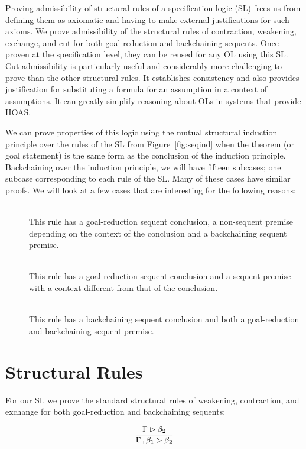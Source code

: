 Proving admissibility of structural rules of a specification logic (SL) frees us from defining them as axiomatic and having to make external justifications for such axioms. We prove admissibility of the structural rules of contraction, weakening, exchange, and cut for both goal-reduction and backchaining sequents. Once proven at the specification level, they can be reused for any OL using this SL. Cut admissibility is particularly useful and considerably more challenging to prove than the other structural rules. It establishes consistency and also provides justification for substituting a formula for an assumption in a context of assumptions. It can greatly simplify reasoning about OLs in systems that provide HOAS.

We can prove properties of this logic using the mutual structural induction principle over the rules of the SL from Figure~\ref{fig:seqind} when the theorem (or goal statement) is the same form as the conclusion of the induction principle. Backchaining over the induction principle, we will have fifteen subcases; one subcase corresponding to each rule of the SL. Many of these cases have similar proofs. We will look at a few cases that are interesting for the following reasons:
\begin{description}
 \item[\rlnmsinit{}] ~\\
  This rule has a goal-reduction sequent conclusion, a non-sequent premise depending on the context of the conclusion and a backchaining sequent premise.
 \item[\rlnmsimp{}] ~\\
  This rule has a goal-reduction sequent conclusion and a sequent premise with a context different from that of the conclusion.
 \item[\rlnmbimp{}] ~\\
  This rule has a backchaining sequent conclusion and both a goal-reduction and backchaining sequent premise.
\end{description}

\section{Structural Rules}
\label{sec:structsl}

For our SL we prove the standard structural rules of weakening, contraction, and exchange for both goal-reduction and backchaining sequents: 
\begin{theorem}
\label{thm:gr_weakening}
$$
\vcenter{\infer{\seqsl[\dyncon{} \, , \beta_1]{\beta_2}}{\seqsl{\beta_2}}}
$$
\end{theorem}

